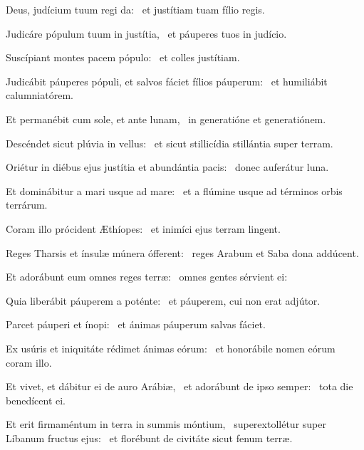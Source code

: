 \item Deus, judícium tuum regi da:~\psstar{} et justítiam tuam fílio regis.

\item Judicáre pópulum tuum in justítia,~\psstar{} et páuperes tuos in judício.

\item Suscípiant montes pacem pópulo:~\psstar{} et colles justítiam.

\item Judicábit páuperes pópuli, et salvos fáciet fílios páuperum:~\psstar{} et humiliábit calumniatórem.

\item Et permanébit cum sole, et ante lunam,~\psstar{} in generatióne et generatiónem.

\item Descéndet sicut plúvia in vellus:~\psstar{} et sicut stillicídia stillántia super terram.

\item Oriétur in diébus ejus justítia et abundántia pacis:~\psstar{} donec auferátur luna.

\item Et dominábitur a mari usque ad mare:~\psstar{} et a flúmine usque ad términos orbis terrárum.

\item Coram illo prócident Æthíopes:~\psstar{} et inimíci ejus terram lingent.

\item Reges Tharsis et ínsulæ múnera ófferent:~\psstar{} reges Arabum et Saba dona addúcent.

\item Et adorábunt eum omnes reges terræ:~\psstar{} omnes gentes sérvient ei:

\item Quia liberábit páuperem a poténte:~\psstar{} et páuperem, cui non erat adjútor.

\item Parcet páuperi et ínopi:~\psstar{} et ánimas páuperum salvas fáciet.

\item Ex usúris et iniquitáte rédimet ánimas eórum:~\psstar{} et honorábile nomen eórum coram illo.

\item Et vivet, et dábitur ei de auro Arábiæ,~\pscross{} et adorábunt de ipso semper:~\psstar{} tota die benedícent ei.

\item Et erit firmaméntum in terra in summis móntium,~\pscross{} superextollétur super Líbanum fructus ejus:~\psstar{} et florébunt de civitáte sicut fenum terræ.

